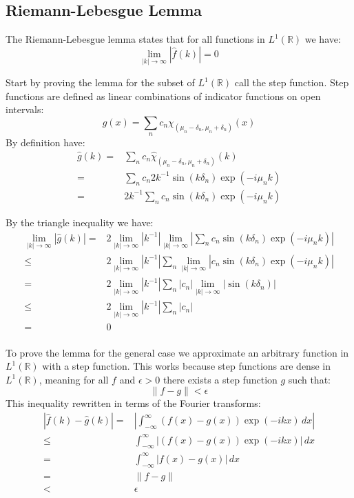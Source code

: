 \subsection{Riemann-Lebesgue Lemma}
The Riemann-Lebesgue lemma states that for all functions in $L^1(\mathbb{R})$ we have:
\[\lim_{|k|\rightarrow \infty}|\hat{f}(k)|= 0  \]

Start by proving the lemma for the subset of $L^1(\mathbb{R})$ call the step function. 
Step functions are defined as linear combinations of indicator functions on open intervals:
\[g(x) = \sum_{n}c_n\chi_{(\mu_n-\delta_n,\mu_n+\delta_n)}(x)\]
By definition have:
\begin{equation*}
\begin{aligned}
\hat{g}(k) =& \sum_nc_n\hat{\chi}_{(\mu_n-\delta_n,\mu_n+\delta_n)}(k)\\
=& \sum_nc_n2k^{-1}\sin\left(k\delta_n\right)\exp(-i\mu_n k) \\
=& 2k^{-1}\sum_nc_n\sin\left(k\delta_n\right)\exp(-i\mu_n k)
\end{aligned}
\end{equation*}

By the triangle inequality we have:
\begin{equation*}
\begin{aligned}
\lim_{|k|\rightarrow \infty}|\hat{g}(k)| =& 2\lim_{|k|\rightarrow \infty}|k^{-1}|\lim_{|k|\rightarrow \infty}\left|\sum_nc_n\sin\left(k\delta_n\right)\exp(-i\mu_n k)\right| \\
\leq& 2\lim_{|k|\rightarrow \infty}|k^{-1}|\sum_n\lim_{|k|\rightarrow \infty}\left|c_n\sin\left(k\delta_n\right)\exp(-i\mu_n k)\right| \\
=& 2\lim_{|k|\rightarrow \infty}|k^{-1}|\sum_n|c_n|\lim_{|k|\rightarrow \infty}\left|\sin\left(k\delta_n\right)\right| \\
\leq&2\lim_{|k|\rightarrow \infty}|k^{-1}|\sum_n|c_n| \\
=& 0\\
\end{aligned}
\end{equation*}

To prove the lemma for the general case we approximate an arbitrary function in $L^1(\mathbb{R})$ with a step function.
This works because step functions are dense in $L^1(\mathbb{R})$, meaning for all $f$ and $\epsilon > 0$ there exists a step function $g$ such that:
\[\|f-g\| < \epsilon\]
This inequality rewritten in terms of the Fourier transforms:
\begin{equation*}
\begin{aligned}
|\hat{f}(k)-\hat{g}(k)| =&\left|\int_{-\infty}^{\infty}(f(x)-g(x))\exp(-ikx)\,dx\right| \\
\leq& \int_{-\infty}^{\infty}|(f(x)-g(x))\exp(-ikx)|\,dx  \\
=&\int_{-\infty}^{\infty}|f(x)-g(x)|\,dx  \\
=&\|f-g\|\\
<& \epsilon \\
\end{aligned}
\end{equation*}


